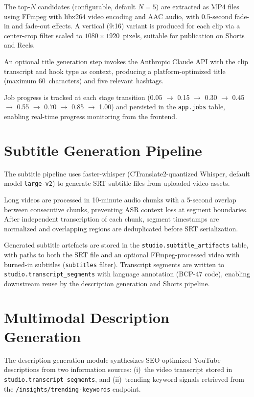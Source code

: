 \documentclass[ENG]{TFUOC}
\begin{document}
The top-$N$ candidates (configurable, default $N=5$) are extracted as MP4 files using FFmpeg with libx264 video encoding and AAC audio, with 0.5-second fade-in and fade-out effects. A vertical (9:16) variant is produced for each clip via a center-crop filter scaled to $1080 \times 1920$~pixels, suitable for publication on Shorts and Reels.

An optional title generation step invokes the Anthropic Claude API with the clip transcript and hook type as context, producing a platform-optimized title (maximum 60~characters) and five relevant hashtags.

Job progress is tracked at each stage transition (0.05 $\rightarrow$ 0.15 $\rightarrow$ 0.30 $\rightarrow$ 0.45 $\rightarrow$ 0.55 $\rightarrow$ 0.70 $\rightarrow$ 0.85 $\rightarrow$ 1.00) and persisted in the \texttt{app.jobs} table, enabling real-time progress monitoring from the frontend.

\section{Subtitle Generation Pipeline}

The subtitle pipeline uses faster-whisper \cite{fasterwhisper} (CTranslate2-quantized Whisper, default model \texttt{large-v2}) to generate SRT subtitle files from uploaded video assets.

Long videos are processed in 10-minute audio chunks with a 5-second overlap between consecutive chunks, preventing ASR context loss at segment boundaries. After independent transcription of each chunk, segment timestamps are normalized and overlapping regions are deduplicated before SRT serialization.

Generated subtitle artefacts are stored in the \texttt{studio.subtitle\_artifacts} table, with paths to both the SRT file and an optional FFmpeg-processed video with burned-in subtitles (\texttt{subtitles} filter). Transcript segments are written to \texttt{studio.transcript\_segments} with language annotation (BCP-47 code), enabling downstream reuse by the description generation and Shorts pipeline.

\section{Multimodal Description Generation}

The description generation module synthesizes SEO-optimized YouTube descriptions from two information sources: (i)~the video transcript stored in \texttt{studio.transcript\_segments}, and (ii)~trending keyword signals retrieved from the \texttt{/insights/trending-keywords} endpoint.
\end{document}
